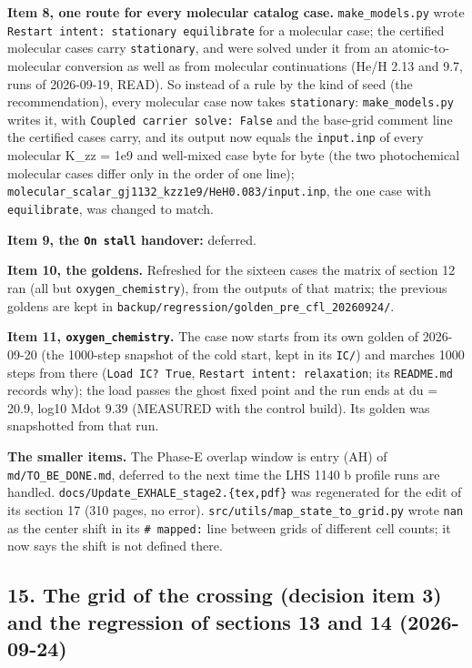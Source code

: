 \documentclass[english,a4paper]{my_memo}
\begin{document}
\textbf{Item 8, one route for every molecular catalog case.} \texttt{make\_models.py}
wrote \texttt{Restart\ intent:\ stationary\ equilibrate} for a molecular case; the
certified molecular cases carry \texttt{stationary}, and were solved under it from
an atomic-to-molecular conversion as well as from molecular continuations
(He/H 2.13 and 9.7, runs of 2026-09-19, READ). So instead of a rule by the
kind of seed (the recommendation), every molecular case now takes
\texttt{stationary}: \texttt{make\_models.py} writes it, with \texttt{Coupled\ carrier\ solve:\ False}
and the base-grid comment line the certified cases carry, and its output now
equals the \texttt{input.inp} of every molecular K\_zz = 1e9 and well-mixed case
byte for byte (the two photochemical molecular cases differ only in the order
of one line); \texttt{molecular\_scalar\_gj1132\_kzz1e9/HeH0.083/input.inp}, the one
case with \texttt{equilibrate}, was changed to match.

\textbf{Item 9, the \texttt{On\ stall} handover:} deferred.

\textbf{Item 10, the goldens.} Refreshed for the sixteen cases the matrix of
section 12 ran (all but \texttt{oxygen\_chemistry}), from the outputs of that matrix;
the previous goldens are kept in \texttt{backup/regression/golden\_pre\_cfl\_20260924/}.

\textbf{Item 11, \texttt{oxygen\_chemistry}.} The case now starts from its own golden of
2026-09-20 (the 1000-step snapshot of the cold start, kept in its \texttt{IC/}) and
marches 1000 steps from there (\texttt{Load\ IC?\ True}, \texttt{Restart\ intent:\ relaxation}; its \texttt{README.md} records why); the load passes the ghost fixed
point and the run ends at du = 20.9, log10 Mdot 9.39 (MEASURED with the
control build). Its golden was snapshotted from that run.

\textbf{The smaller items.} The Phase-E overlap window is entry (AH) of
\texttt{md/TO\_BE\_DONE.md}, deferred to the next time the LHS 1140 b profile runs
are handled. \texttt{docs/Update\_EXHALE\_stage2.\{tex,pdf\}} was regenerated for the
edit of its section 17 (310 pages, no error). \texttt{src/utils/map\_state\_to\_grid.py}
wrote \texttt{nan} as the center shift in its \texttt{\#\ mapped:} line between grids of
different cell counts; it now says the shift is not defined there.

\subsection{15. The grid of the crossing (decision item 3) and the regression of sections 13 and 14 (2026-09-24)}\label{15-the-grid-of-the-crossing-decision-item-3-and-the-regression-of-sections-13-and-14-2026-09-24}
\end{document}
